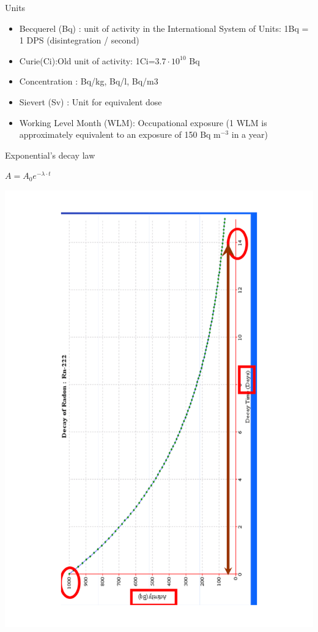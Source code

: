 \begin{frame}{Units}

\begin{exampleblock}{}

\begin{itemize}
	\item Becquerel (Bq) : unit of activity in the International System of
Units: 1Bq = 1 DPS (disintegration / second) \item Curie(Ci):Old unit of activity: 1Ci=$3.7\cdot10^{10}$ Bq
\item Concentration : Bq/kg, Bq/l, Bq/m3
\item Sievert (Sv) : Unit for equivalent dose
\item Working Level Month (WLM): Occupational exposure (1 WLM is approximately equivalent to an exposure of 150 Bq m$^{-3}$ in a year)
\end{itemize}

\end{exampleblock}

\end{frame}

\begin{frame}{Exponential's decay law}

\centering \alert{$A=A_0e^{-\lambda\cdot t}$}

\centering
\vskip-1.5cm
\includegraphics[scale=0.4,angle=-90]{figures/20160218_rsw_exponentiallaw.pdf}

\end{frame}

